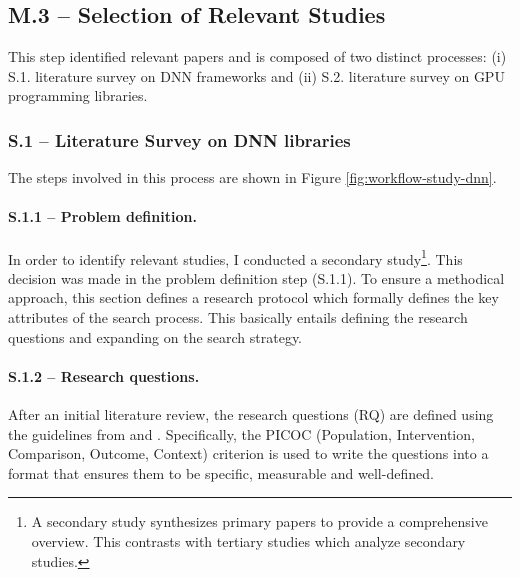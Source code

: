 \subsection{M.3 -- Selection of Relevant Studies}
This step identified relevant papers and is composed of two distinct processes: (i) S.1. literature
survey on DNN frameworks and (ii) S.2. literature survey on GPU programming libraries.

\subsubsection{S.1 -- Literature Survey on DNN libraries}
The steps involved in this process are shown in Figure \ref{fig:workflow-study-dnn}.

\paragraph{S.1.1 -- Problem definition.}
In order to identify relevant studies, I conducted a secondary study\footnote{A secondary study
	synthesizes primary papers to provide a comprehensive overview. This contrasts with tertiary
	studies which analyze secondary studies.}. This decision was made in the problem definition step
(S.1.1). To ensure a methodical approach, this section defines a research protocol which formally
defines the key attributes of the search process. This basically entails defining the research
questions and expanding on the search strategy.

\paragraph{S.1.2 -- Research questions.}
After an initial literature review, the research questions (RQ) are defined using the guidelines
from \cite{kitchenham_evidence-based_2015} and \cite{keele_systematic_2007}. Specifically, the
PICOC (Population, Intervention, Comparison, Outcome, Context) criterion is used to write the
questions into a format that ensures them to be specific, measurable and well-defined.


